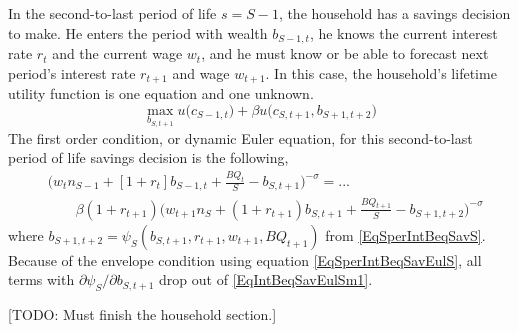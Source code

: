 \documentclass[letterpaper,12pt]{article}
\theoremstyle{definition}
\numberwithin{equation}{section}
\numberwithin{exercise}{section}
\begin{document}
\begin{spacing}{1.5}
      In the second-to-last period of life $s=S-1$, the household has a savings decision to make. He enters the period with wealth $b_{S-1,t}$, he knows the current interest rate $r_t$ and the current wage $w_t$, and he must know or be able to forecast next period's interest rate $r_{t+1}$ and wage $w_{t+1}$. In this case, the household's lifetime utility function is one equation and one unknown.
      \begin{equation}\label{EqIntBeqlifutSm1}
         \max_{b_{S,t+1}} u\bigl(c_{S-1,t}\bigr) + \beta u\bigl(c_{S,t+1},b_{S+1,t+2}\bigr)
      \end{equation}
      The first order condition, or dynamic Euler equation, for this second-to-last period of life savings decision is the following,
      \begin{equation}\label{EqIntBeqSavEulSm1}
         \begin{split}
            &\biggl(w_t n_{S-1} + [1 + r_{t}]b_{S-1,t} + \frac{BQ_t}{S} - b_{S,t+1}\biggr)^{-\sigma} = ... \\
            &\qquad \beta(1+r_{t+1})\biggl(w_{t+1}n_S + (1 + r_{t+1})b_{S,t+1} + \frac{BQ_{t+1}}{S} - b_{S+1,t+2}\biggr)^{-\sigma}
         \end{split}
      \end{equation}
      where $b_{S+1,t+2}=\psi_S\left(b_{S,t+1},r_{t+1},w_{t+1},BQ_{t+1}\right)$ from \eqref{EqSperIntBeqSavS}. Because of the envelope condition using equation \eqref{EqSperIntBeqSavEulS}, all terms with $\partial\psi_S/\partial b_{S,t+1}$ drop out of \eqref{EqIntBeqSavEulSm1}.

      [TODO: Must finish the household section.]


\end{spacing}
\end{document}
